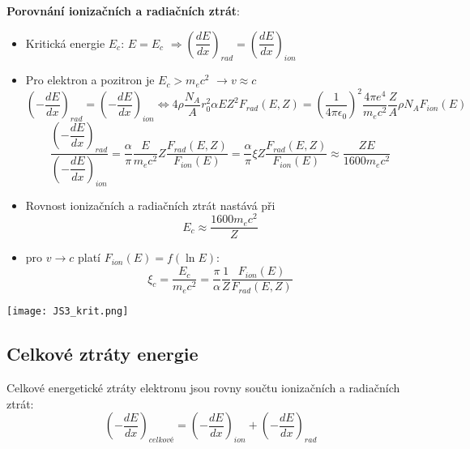 \documentclass[../../main.tex]{subfiles}
\begin{document}
\textbf{Porovnání ionizačních a radiačních ztrát}:
\begin{itemize}
	\item Kritická energie $E_c$: $ E = E_c$ $\Rightarrow \left( \dfrac{dE}{dx}\right) _{rad} = \left(\dfrac{dE}{dx} \right)_{ion}$
	\item Pro elektron a pozitron je $E_c > m_e c^2$ $\rightarrow v \approx c$
	\begin{equation}
	\left(- \dfrac{dE}{dx}\right) _{rad} = \left(- \dfrac{dE}{dx} \right)_{ion} \Leftrightarrow 4 \rho \dfrac{N_A}{A} r_{0}^2 \alpha E Z^2 F_{rad} (E,Z) = \left( \dfrac{1}{4 \pi \epsilon_0} \right)^2 \dfrac{4 \pi e^4 }{m_e c^2} \dfrac{Z}{A} \rho N_A F_{ion} (E)
	\end{equation}
	\begin{equation}
	\dfrac{	\left(- \dfrac{dE}{dx}\right) _{rad}}{\left(- \dfrac{dE}{dx} \right)_{ion}} = \dfrac{\alpha}{\pi} \dfrac{E}{m_e c^2} Z \dfrac{F_{rad} (E,Z)}{F_{ion}(E)} = \dfrac{\alpha}{\pi} \xi Z \dfrac{F_{rad} (E,Z)}{F_{ion}(E)} \approx \dfrac{ZE}{1600 m_e c^2}
	\end{equation}
	\item Rovnost ionizačních a radiačních ztrát nastává při 
	\begin{equation}
	E_c \approx \dfrac{1600 m_e c^2}{Z}
	\end{equation}
	\item pro $v \rightarrow c$ platí $F_{ion}(E) = f(\ln E)$:
	\begin{equation}
	\xi _ c = \dfrac{E_c}{m_e c^2} = \dfrac{\pi}{\alpha} \dfrac{1}{Z} \dfrac{F_{ion}(E)}{F_{rad}(E,Z)}
	\end{equation}
\end{itemize}

\begin{center}
	\texttt{[image: JS3\_krit.png]}
\end{center}
 
\subsection{Celkové ztráty energie}

Celkové energetické ztráty elektronu jsou rovny součtu ionizačních a radiačních ztrát:
\begin{equation}
\left( - \dfrac{dE}{dx}\right)_{celkové} = \left( - \dfrac{dE}{dx}\right)_{ion} + \left( - \dfrac{dE}{dx}\right)_{rad} 
\end{equation}
\end{document}
